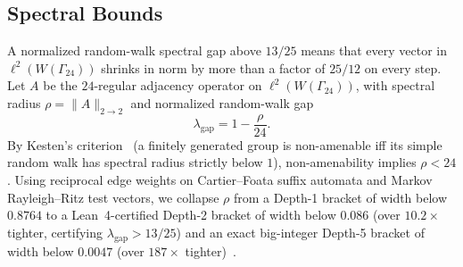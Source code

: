 \subsection{Spectral Bounds}
\label{subsec:spectral-bounds}

A normalized random-walk spectral gap above $13/25$ means that every vector in $\ell^2(W(\Gamma_{24}))$ shrinks in norm by more than a factor of $25/12$ on every step. Let $A$ be the $24$-regular adjacency operator on $\ell^2(W(\Gamma_{24}))$, with spectral radius $\rho = \|A\|_{2 \to 2}$ and normalized random-walk gap
\begin{equation}
\label{eq:gap-def}
\lambda_{\mathrm{gap}} = 1 - \frac{\rho}{24}.
\end{equation}
By Kesten's criterion~\cite{kesten1959} (a finitely generated group is non-amenable iff its simple random walk has spectral radius strictly below $1$), non-amenability implies $\rho < 24$. Using reciprocal edge weights on Cartier--Foata suffix automata and Markov Rayleigh--Ritz test vectors, we collapse $\rho$ from a Depth-1 bracket of width below $0.8764$ to a Lean~4-certified Depth-2 bracket of width below $0.086$ (over $10.2\times$ tighter, certifying $\lambda_{\mathrm{gap}} > 13/25$) and an exact big-integer Depth-5 bracket of width below $0.0047$ (over $187\times$ tighter)~\cite{pollard2026repo}.

